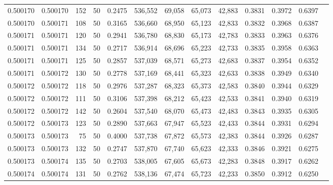 \begin{tabular}{rrrrrrrrrrrrr}
0.500170 & 0.500170 &   152 &  50 &                                     0.2475 & 536,552 &  69,058 &  65,073 &  42,883 & 0.3831 & 0.3972 & 0.6397 \\
0.500170 & 0.500171 &   108 &  50 &                                     0.3165 & 536,660 &  68,950 &  65,123 &  42,833 & 0.3832 & 0.3968 & 0.6387 \\
0.500171 & 0.500171 &   120 &  50 &                                     0.2941 & 536,780 &  68,830 &  65,173 &  42,783 & 0.3833 & 0.3963 & 0.6376 \\
0.500171 & 0.500171 &   134 &  50 &                                     0.2717 & 536,914 &  68,696 &  65,223 &  42,733 & 0.3835 & 0.3958 & 0.6363 \\
0.500171 & 0.500171 &   125 &  50 &                                     0.2857 & 537,039 &  68,571 &  65,273 &  42,683 & 0.3837 & 0.3954 & 0.6352 \\
0.500171 & 0.500172 &   130 &  50 &                                     0.2778 & 537,169 &  68,441 &  65,323 &  42,633 & 0.3838 & 0.3949 & 0.6340 \\
0.500172 & 0.500172 &   118 &  50 &                                     0.2976 & 537,287 &  68,323 &  65,373 &  42,583 & 0.3840 & 0.3944 & 0.6329 \\
0.500172 & 0.500172 &   111 &  50 &                                     0.3106 & 537,398 &  68,212 &  65,423 &  42,533 & 0.3841 & 0.3940 & 0.6319 \\
0.500172 & 0.500172 &   142 &  50 &                                     0.2604 & 537,540 &  68,070 &  65,473 &  42,483 & 0.3843 & 0.3935 & 0.6305 \\
0.500172 & 0.500173 &   123 &  50 &                                     0.2890 & 537,663 &  67,947 &  65,523 &  42,433 & 0.3844 & 0.3931 & 0.6294 \\
0.500173 & 0.500173 &    75 &  50 &                                     0.4000 & 537,738 &  67,872 &  65,573 &  42,383 & 0.3844 & 0.3926 & 0.6287 \\
0.500173 & 0.500173 &   132 &  50 &                                     0.2747 & 537,870 &  67,740 &  65,623 &  42,333 & 0.3846 & 0.3921 & 0.6275 \\
0.500173 & 0.500174 &   135 &  50 &                                     0.2703 & 538,005 &  67,605 &  65,673 &  42,283 & 0.3848 & 0.3917 & 0.6262 \\
0.500174 & 0.500174 &   131 &  50 &                                     0.2762 & 538,136 &  67,474 &  65,723 &  42,233 & 0.3850 & 0.3912 & 0.6250 \\

\end{tabular}
